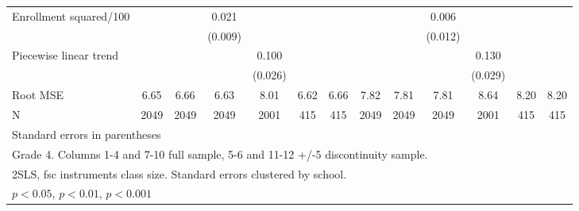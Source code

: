{\begin{tabular}{l*{12}{c}}
\addlinespace
Enrollment squared/100&                     &                     &       0.021\sym{*}  &                     &                     &                     &                     &                     &       0.006         &                     &                     &                     \\
            &                     &                     &     (0.009)         &                     &                     &                     &                     &                     &     (0.012)         &                     &                     &                     \\
\addlinespace
Piecewise linear trend&                     &                     &                     &       0.100\sym{***}&                     &                     &                     &                     &                     &       0.130\sym{***}&                     &                     \\
            &                     &                     &                     &     (0.026)         &                     &                     &                     &                     &                     &     (0.029)         &                     &                     \\
\midrule
Root MSE    &        6.65         &        6.66         &        6.63         &        8.01         &        6.62         &        6.66         &        7.82         &        7.81         &        7.81         &        8.64         &        8.20         &        8.20         \\
N           &        2049         &        2049         &        2049         &        2001         &         415         &         415         &        2049         &        2049         &        2049         &        2001         &         415         &         415         \\
\bottomrule
\multicolumn{13}{l}{\footnotesize Standard errors in parentheses}\\
\multicolumn{13}{l}{\footnotesize Grade 4. Columns 1-4 and 7-10 full sample, 5-6 and 11-12 +/-5 discontinuity sample.}\\
\multicolumn{13}{l}{\footnotesize 2SLS, fsc instruments class size. Standard errors clustered by school.}\\
\multicolumn{13}{l}{\footnotesize \sym{*} \(p<0.05\), \sym{**} \(p<0.01\), \sym{***} \(p<0.001\)}\\
\end{tabular}
}
